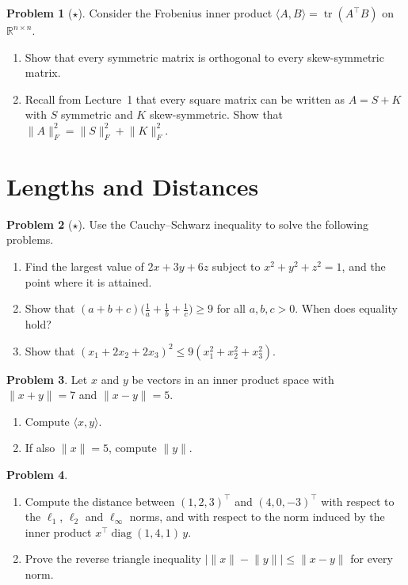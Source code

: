 \documentclass[11pt]{article}
\theoremstyle{definition}
\newtheorem{problem}{Problem}[section]
\newcommand{\norm}[1]{\lVert #1 \rVert}
\newcommand{\ip}[2]{\langle #1, #2 \rangle}
\DeclareMathOperator{\tr}{tr}
\DeclareMathOperator{\diag}{diag}
\begin{document}
\begin{problem}[$\star$]\label{pr:frobenius-ip}
    Consider the Frobenius inner product $\ip{A}{B} = \tr(A^\top B)$ on $\mathbb{R}^{n \times n}$.
    \begin{enumerate}[label=(\alph*)]
        \item Show that every symmetric matrix is orthogonal to every skew-symmetric matrix.
        \item Recall from Lecture~1 that every square matrix can be written as $A = S + K$ with $S$ symmetric and $K$ skew-symmetric. Show that $\norm{A}_F^2 = \norm{S}_F^2 + \norm{K}_F^2$.
    \end{enumerate}
\end{problem}

\section{Lengths and Distances}

\begin{problem}[$\star$]\label{pr:cs-apps}
    Use the Cauchy--Schwarz inequality to solve the following problems.
    \begin{enumerate}[label=(\alph*)]
        \item Find the largest value of $2x + 3y + 6z$ subject to $x^2 + y^2 + z^2 = 1$, and the point where it is attained.
        \item Show that $(a + b + c)\big(\frac{1}{a} + \frac{1}{b} + \frac{1}{c}\big) \geq 9$ for all $a, b, c > 0$. When does equality hold?
        \item Show that $(x_1 + 2x_2 + 2x_3)^2 \leq 9(x_1^2 + x_2^2 + x_3^2)$.
    \end{enumerate}
\end{problem}

\begin{problem}\label{pr:polarization}
    Let $x$ and $y$ be vectors in an inner product space with $\norm{x + y} = 7$ and $\norm{x - y} = 5$.
    \begin{enumerate}[label=(\alph*)]
        \item Compute $\ip{x}{y}$.
        \item If also $\norm{x} = 5$, compute $\norm{y}$.
    \end{enumerate}
\end{problem}

\begin{problem}\label{pr:dist}
    \begin{enumerate}[label=(\alph*)]
        \item Compute the distance between $(1, 2, 3)^\top$ and $(4, 0, -3)^\top$ with respect to the $\ell_1$, $\ell_2$ and $\ell_\infty$ norms, and with respect to the norm induced by the inner product $x^\top \diag(1, 4, 1)\, y$.
        \item Prove the reverse triangle inequality $\big|\norm{x} - \norm{y}\big| \leq \norm{x - y}$ for every norm.
    \end{enumerate}
\end{problem}
\end{document}
